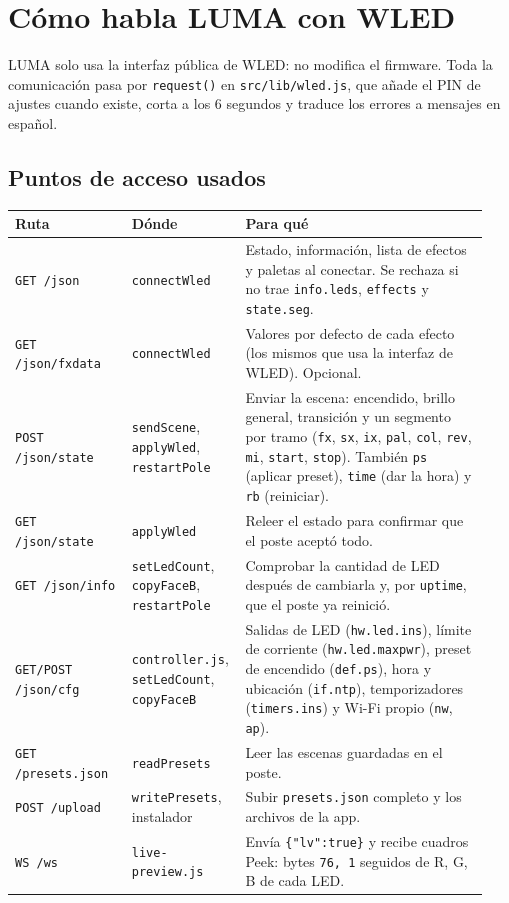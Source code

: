 \chapter{Cómo habla LUMA con WLED}\label{cap:contrato}

LUMA solo usa la interfaz pública de WLED: no modifica el firmware. Toda la comunicación pasa por \texttt{request()} en \texttt{src/lib/wled.js}, que añade el PIN de ajustes cuando existe, corta a los 6 segundos y traduce los errores a mensajes en español.

\section{Puntos de acceso usados}

\begin{longtable}{@{}>{\raggedright\arraybackslash}p{0.24\linewidth} >{\raggedright\arraybackslash}p{0.2\linewidth} >{\raggedright\arraybackslash}p{0.5\linewidth}@{}}
\toprule
\textbf{Ruta} & \textbf{Dónde} & \textbf{Para qué} \\ \midrule \endhead
\texttt{GET /json} & \texttt{connectWled} & Estado, información, lista de efectos y paletas al conectar. Se rechaza si no trae \texttt{info.leds}, \texttt{effects} y \texttt{state.seg}. \\
\texttt{GET /json/fxdata} & \texttt{connectWled} & Valores por defecto de cada efecto (los mismos que usa la interfaz de WLED). Opcional. \\
\texttt{POST /json/state} & \texttt{sendScene}, \texttt{applyWled}, \texttt{restartPole} & Enviar la escena: encendido, brillo general, transición y un segmento por tramo (\texttt{fx}, \texttt{sx}, \texttt{ix}, \texttt{pal}, \texttt{col}, \texttt{rev}, \texttt{mi}, \texttt{start}, \texttt{stop}). También \texttt{ps} (aplicar preset), \texttt{time} (dar la hora) y \texttt{rb} (reiniciar). \\
\texttt{GET /json/state} & \texttt{applyWled} & Releer el estado para confirmar que el poste aceptó todo. \\
\texttt{GET /json/info} & \texttt{setLedCount}, \texttt{copyFaceB}, \texttt{restartPole} & Comprobar la cantidad de LED después de cambiarla y, por \texttt{uptime}, que el poste ya reinició. \\
\texttt{GET/POST /json/cfg} & \texttt{controller.js}, \texttt{setLedCount}, \texttt{copyFaceB} & Salidas de LED (\texttt{hw.led.ins}), límite de corriente (\texttt{hw.led.maxpwr}), preset de encendido (\texttt{def.ps}), hora y ubicación (\texttt{if.ntp}), temporizadores (\texttt{timers.ins}) y Wi-Fi propio (\texttt{nw}, \texttt{ap}). \\
\texttt{GET /presets.json} & \texttt{readPresets} & Leer las escenas guardadas en el poste. \\
\texttt{POST /upload} & \texttt{writePresets}, instalador & Subir \texttt{presets.json} completo y los archivos de la app. \\
\texttt{WS /ws} & \texttt{live-preview.js} & Envía \texttt{\{"lv":true\}} y recibe cuadros Peek: bytes \texttt{76, 1} seguidos de R, G, B de cada LED. \\
\bottomrule
\end{longtable}


